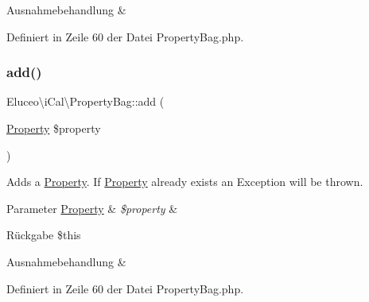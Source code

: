 \begin{DoxyExceptions}{Ausnahmebehandlung}
{\em } & \\
\hline
\end{DoxyExceptions}


Definiert in Zeile 60 der Datei Property\+Bag.\+php.

\mbox{\label{class_eluceo_1_1i_cal_1_1_property_bag_a285b4d352bd4b646096b00189461272d}} 
\subsubsection{\texorpdfstring{add()}{add()}\hspace{0.1cm}{\footnotesize\ttfamily [2/3]}}
{\footnotesize\ttfamily Eluceo\textbackslash{}i\+Cal\textbackslash{}\+Property\+Bag\+::add (\begin{DoxyParamCaption}\item[{\mbox{\hyperlink{class_eluceo_1_1i_cal_1_1_property}{Property}}}]{\$property }\end{DoxyParamCaption})}

Adds a \mbox{\hyperlink{class_eluceo_1_1i_cal_1_1_property}{Property}}. If \mbox{\hyperlink{class_eluceo_1_1i_cal_1_1_property}{Property}} already exists an Exception will be thrown.


\begin{DoxyParams}[1]{Parameter}
\mbox{\hyperlink{class_eluceo_1_1i_cal_1_1_property}{Property}} & {\em \$property} & \\
\hline
\end{DoxyParams}
\begin{DoxyReturn}{Rückgabe}
\$this
\end{DoxyReturn}

\begin{DoxyExceptions}{Ausnahmebehandlung}
{\em } & \\
\hline
\end{DoxyExceptions}


Definiert in Zeile 60 der Datei Property\+Bag.\+php.

\mbox{\label{class_eluceo_1_1i_cal_1_1_property_bag_a285b4d352bd4b646096b00189461272d}} 

